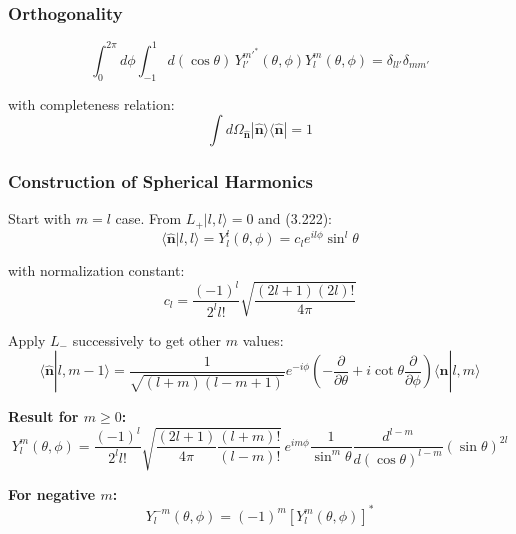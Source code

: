 \documentclass[11pt,a4paper]{article}
\begin{document}
\subsubsection{Orthogonality}

\begin{equation}
\int_0^{2\pi}d\phi\int_{-1}^{1}d(\cos\theta)\,Y_{l'}^{m'^*}(\theta, \phi)Y_l^m(\theta, \phi) = \delta_{ll'}\delta_{mm'}
\tag{3.239}
\end{equation}

with completeness relation:
\begin{equation}
\int d\Omega_{\hat{\mathbf{n}}}|\hat{\mathbf{n}}\rangle\langle\hat{\mathbf{n}}| = 1
\tag{3.240}
\end{equation}

\subsubsection{Construction of Spherical Harmonics}

Start with $m = l$ case. From $L_+|l, l\rangle = 0$ and (3.222):
\begin{equation}
\langle\hat{\mathbf{n}}|l, l\rangle = Y_l^l(\theta, \phi) = c_l e^{il\phi}\sin^l\theta
\tag{3.243}
\end{equation}

with normalization constant:
\begin{equation}
c_l = \frac{(-1)^l}{2^l l!}\sqrt{\frac{(2l+1)(2l)!}{4\pi}}
\tag{3.244}
\end{equation}

Apply $L_-$ successively to get other $m$ values:
\begin{equation}
\langle\hat{\mathbf{n}}|l, m-1\rangle = \frac{1}{\sqrt{(l+m)(l-m+1)}}e^{-i\phi}\left(-\frac{\partial}{\partial\theta} + i\cot\theta\frac{\partial}{\partial\phi}\right)\langle\hat{\mathbf{n}}|l, m\rangle
\tag{3.245}
\end{equation}

\textbf{Result for $m \geq 0$:}
\begin{equation}
\boxed{Y_l^m(\theta, \phi) = \frac{(-1)^l}{2^l l!}\sqrt{\frac{(2l+1)}{4\pi}\frac{(l+m)!}{(l-m)!}}\,e^{im\phi}\frac{1}{\sin^m\theta}\frac{d^{l-m}}{d(\cos\theta)^{l-m}}(\sin\theta)^{2l}}
\tag{3.246}
\end{equation}

\textbf{For negative $m$:}
\begin{equation}
\boxed{Y_l^{-m}(\theta, \phi) = (-1)^m[Y_l^m(\theta, \phi)]^*}
\tag{3.247}
\end{equation}
\end{document}
